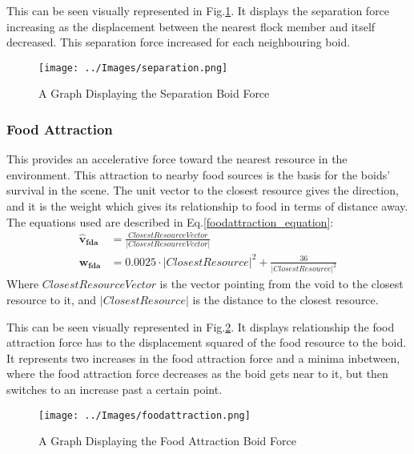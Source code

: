 This can be seen visually represented in Fig.\ref{fig:separation}. It displays the separation force increasing as the displacement between the nearest flock member and itself decreased. This separation force increased for each neighbouring boid.
\begin{figure}
	\texttt{[image: ../Images/separation.png]}
	\caption{A Graph Displaying the Separation Boid Force}
	\label{fig:separation}
\end{figure}

\subsubsection{Food Attraction}
This provides an accelerative force toward the nearest resource in the environment. This attraction to nearby food sources is the basis for the boids' survival in the scene. The unit vector to the closest resource gives the direction, and it is the weight which gives its relationship to food in terms of distance away. The equations used are described in Eq.\ref{foodattraction_equation}:
\begin{equation}
\begin{split}
\boldsymbol{\hat{v}_{fda}} &= \frac{ClosestResourceVector} {|ClosestResourceVector|} \\
\boldsymbol{w_{fda}} &= 0.0025 \cdot |ClosestResource|^2 + \frac{36} {|ClosestResource|^2}
\end{split}
\label{foodattraction_equation}
\end{equation}
Where $ClosestResourceVector$ is the vector pointing from the void to the closest resource to it, and $|ClosestResource|$ is the distance to the closest resource.

This can be seen visually represented in Fig.\ref{fig:foodattraction}. It displays relationship the food attraction force has to the displacement squared of the food resource to the boid. It represents two increases in the food attraction force and a minima inbetween, where the food attraction force decreases as the boid gets near to it, but then switches to an increase past a certain point.
\begin{figure}
	\texttt{[image: ../Images/foodattraction.png]}
	\caption{A Graph Displaying the Food Attraction Boid Force}
	\label{fig:foodattraction}
\end{figure}

